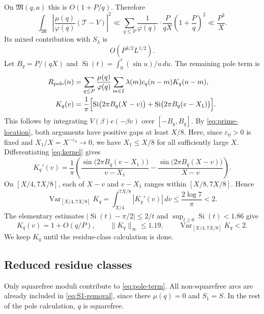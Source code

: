 \documentclass{amsart}
\numberwithin{equation}{section}
\numberwithin{table}{section}
\newcommand{\M}{\mathfrak M}
\newcommand{\Si}{\operatorname{Si}}
\begin{document}
On $\M(q,a)$ this is $O(1+P/q)$. Therefore
\[
\int_\M\left|\frac{\mu(q)}{\varphi(q)}(\mathcal T-V)\right|^2
\ll\sum_{q\le P}\frac1{\varphi(q)}\cdot\frac{P}{qX}
\left(1+\frac Pq\right)^2
\ll\frac{P^3}{X}.
\]
Its mixed contribution with $S_\lambda$ is
\begin{equation}\label{eq:pole-discretization}
O(P^{3/2}L^{1/2}).
\end{equation}
Let $B_q=P/(qX)$ and $\Si(t)=\int_0^t(\sin u)/u\,du$. The remaining
pole term is
\begin{align}
R_{\mathrm{pole}}(n)
&=\sum_{q\le P}\frac{\mu(q)}{\varphi(q)}
\sum_{m\in I}\lambda(m)c_q(n-m)K_q(n-m),\label{eq:pole-term}\\
K_q(v)&=\frac1\pi\Bigl[\Si\bigl(2\pi B_q(X-v)\bigr)
+\Si\bigl(2\pi B_q(v-X_1)\bigr)\Bigr].
\label{eq:kernel}
\end{align}
This follows by integrating $V(\beta)e(-\beta v)$ over $[-B_q,B_q]$.
By \eqref{eq:prime-location}, both arguments have positive gaps at least
$X/8$. Here, since $\varepsilon_0>0$ is fixed and $X_1/X=X^{-\varepsilon_0}\to0$,
we have $X_1\le X/8$ for all sufficiently large $X$.
Differentiating \eqref{eq:kernel} gives
\begin{equation}\label{eq:kernel-derivative}
K_q'(v)=\frac1\pi\left(
\frac{\sin\bigl(2\pi B_q(v-X_1)\bigr)}{v-X_1}
-\frac{\sin\bigl(2\pi B_q(X-v)\bigr)}{X-v}
\right).
\end{equation}
On $[X/4,7X/8]$, each of $X-v$ and $v-X_1$ ranges within
$[X/8,7X/8]$. Hence
\[
\operatorname{Var}_{[X/4,7X/8]}K_q
=\int_{X/4}^{7X/8}|K_q'(v)|\,dv
\le\frac{2\log 7}{\pi}<2.
\]
The elementary estimates
$|\Si(t)-\pi/2|\le2/t$ and $\sup_{t\ge0}\Si(t)<1.86$ give
\begin{equation}\label{eq:kernel-bounds}
K_q(v)=1+O(q/P),\qquad \|K_q\|_\infty\le1.19,
\qquad \operatorname{Var}_{[X/4,7X/8]}K_q<2.
\end{equation}
We keep $K_q$ until the residue-class calculation is done.

\subsection{Reduced residue classes}

Only squarefree moduli contribute to \eqref{eq:pole-term}. All
non-squarefree arcs are already included in \eqref{eq:S1-removal}, since
there $\mu(q)=0$ and $S_1=S$. In the rest of the pole calculation, $q$ is
squarefree.
\end{document}
